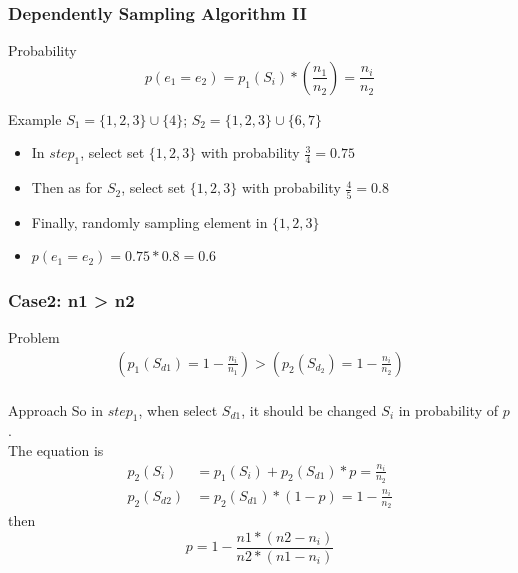 \documentclass[notheorems, aspectratio=54]{beamer}
\begin{document}
\begin{frame}
    \frametitle{Dependently Sampling Algorithm II}
    \begin{block}{Probability}
        $$
            p(e_1 = e_2) = p_1(S_i)*(\frac{n_1}{n_2}) = \frac{n_i}{n_2}
        $$
    \end{block}
    \begin{block}{Example}
        $S_1 =  \{1,2,3\} \cup \{4\}$; $S_2 = \{1,2,3\} \cup \{6,7\}$
        \begin{itemize}
            \item In $step_1$, select set $\{1,2,3\}$ with probability $\frac{3}{4} = 0.75$
            \item Then as for $S_2$, select set $\{1,2,3\}$ with probability $\frac{4}{5}=0.8$
            \item Finally, randomly sampling element in $\{1,2,3\}$
            \item $p(e_1 = e_2) = 0.75*0.8=0.6$
        \end{itemize}
    \end{block}
\end{frame}

\begin{frame}
    \frametitle{Case2: n1 > n2}
    \begin{block}{Problem}
        \begin{equation}
            \begin{aligned}
                (p_1(S_{d1}) = 1-\frac{n_i}{n_1}) > (p_2(S_{d_2}) = 1-\frac{n_i}{n_2}) \\
            \end{aligned}
        \end{equation}
    \end{block}
    \begin{block}{Approach}
        So in $step_1$, when select $S_{d1}$, it should be changed $S_{i}$ in probability of $p$. \\
        The equation is 
        \begin{equation}
            \begin{aligned}
                p_2(S_i) &= p_1(S_i)+p_2(S_{d1})*p = \frac{n_i}{n_2} \\
                p_2(S_{d2}) &= p_2(S_{d1})*(1-p) = 1-\frac{n_i}{n_2}
            \end{aligned}
        \end{equation}
        then
        $$p = 1-\frac{n1*(n2-n_i)}{n2*(n1-n_i)}$$
    \end{block}
\end{frame}
\end{document}
